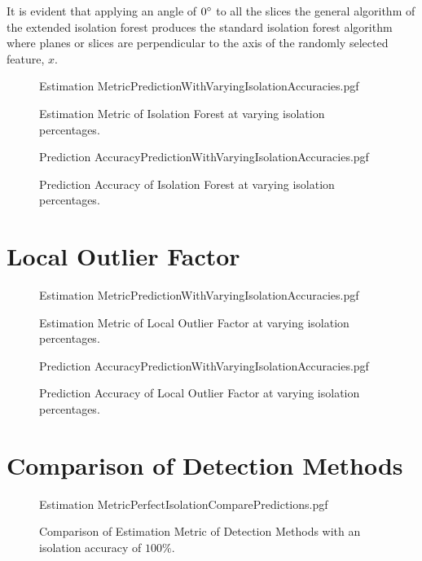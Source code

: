 It is evident that applying an angle of $0\degree$ to all the slices the general algorithm of the extended isolation forest produces the standard isolation forest algorithm where planes or slices are perpendicular to the axis of the randomly selected feature, $x$.

\begin{figure}[!htb]
	\centering
	{Estimation MetricPredictionWithVaryingIsolationAccuracies.pgf}
	
	\caption{Estimation Metric of Isolation Forest at varying isolation percentages.}
	\label{fig:IsolationForestWithVaryingIsolationEstimation}
\end{figure}

\begin{figure}[!htb]
	\centering
	{Prediction AccuracyPredictionWithVaryingIsolationAccuracies.pgf}
	
	\caption{Prediction Accuracy of Isolation Forest at varying isolation percentages.}
	\label{fig:IsolationForestWithVaryingIsolationPrediction}
\end{figure}

\section{Local Outlier Factor}
\begin{figure}[!htb]
	\centering
	{Estimation MetricPredictionWithVaryingIsolationAccuracies.pgf}
	
	\caption{Estimation Metric of Local Outlier Factor at varying isolation percentages.}
	\label{fig:LOFWithVaryingIsolationEstimation}
\end{figure}

\begin{figure}[!htb]
	\centering
	{Prediction AccuracyPredictionWithVaryingIsolationAccuracies.pgf}
	
	\caption{Prediction Accuracy of Local Outlier Factor at varying isolation percentages.}
	\label{fig:LOFWithVaryingIsolationPrediction}
\end{figure}

\section{Comparison of Detection Methods}
\begin{figure}[!htb]
	\centering
	{Estimation MetricPerfectIsolationComparePredictions.pgf}
	
	\caption{Comparison of Estimation Metric of Detection Methods with an isolation accuracy of $100\%$.}
	\label{fig:DetectionMethodsWithPerfectIsolation}
\end{figure}


